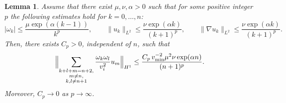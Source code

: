 \documentclass[a4paper,reqno,twoside]{amsart}
\numberwithin{equation}{section}
\newtheorem{lemma}[theorem]{Lemma}
\theoremstyle{definition}
\newcommand{\<}{\ensuremath \leq}
\renewcommand{\>}{\ensuremath \geq}
\begin{document}
\begin{lemma}\label{lem:bound1}
    Assume that there exist $\mu, \nu, \alpha > 0$ such that for some positive integer $p$
    the following estimates hold for $k = 0, \dots, n$:
    \begin{equation}
        \lvert \omega_k \rvert \leq \frac{\mu \exp(\alpha(k-1))}{k^p},
        \qquad
        \lVert u_k \rVert_{L^2} \leq \frac{\nu \exp(\alpha k)}{(k+1)^p},
        \qquad
        \lVert \nabla u_k \rVert_{L^2} \leq \frac{\nu \exp(\alpha k)}{(k+1)^p}.
    \end{equation}
    Then, there exists $C_p > 0$, independent of $n$, such that
    \begin{equation}
        \Bigl\lVert \sum_{\substack{k+l+m = n+2, \\ m \neq n, \\ k, l \neq n+1}}
        \frac{\omega_k \omega_l}{v_i^2} u_m \Bigr\rVert_{H^1}
        \leq \frac{C_p \, v_{\min}^{-2} \mu^2 \nu \exp(\alpha n)}{(n+1)^p}.
    \end{equation}
    Moreover, $C_p \to 0$ as $p \to \infty$.
\end{lemma}
\end{document}
